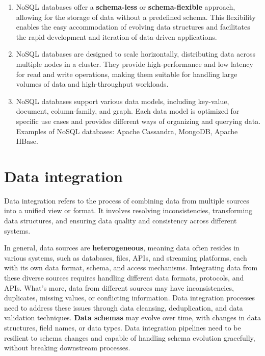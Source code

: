 \begin{enumerate}
    \item NoSQL databases offer a \textbf{schema-less} or \textbf{schema-flexible} approach, allowing for the storage of data without a predefined schema. This flexibility enables the easy accommodation of evolving data structures and facilitates the rapid development and iteration of data-driven applications\footnotemark[21].
    \item NoSQL databases are designed to scale horizontally, distributing data across multiple nodes in a cluster. They provide high-performance and low latency for read and write operations, making them suitable for handling large volumes of data and high-throughput workloads\footnotemark[21].
    \item NoSQL databases support various data models, including key-value, document, column-family, and graph. Each data model is optimized for specific use cases and provides different ways of organizing and querying data. Examples of NoSQL databases: Apache Cassandra, MongoDB, Apache HBase\footnotemark[21].
\end{enumerate}

\section{Data integration}

Data integration refers to the process of combining data from multiple sources into a unified view or format. It involves resolving inconsistencies, transforming data structures, and ensuring data quality and consistency across different systems.

In general, data sources are \textbf{heterogeneous}, meaning data often resides in various systems, such as databases, files, APIs, and streaming platforms, each with its own data format, schema, and access mechanisms. Integrating data from these diverse sources requires handling different data formats, protocols, and APIs. What's more, data from different sources may have inconsistencies, duplicates, missing values, or conflicting information. Data integration processes need to address these issues through data cleansing, deduplication, and data validation techniques. \textbf{Data schemas} may evolve over time, with changes in data structures, field names, or data types. Data integration pipelines need to be resilient to schema changes and capable of handling schema evolution gracefully, without breaking downstream processes.

